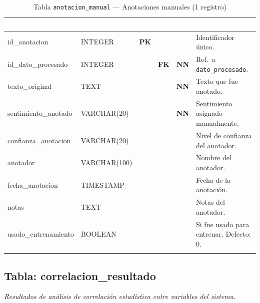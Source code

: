 \documentclass[11pt,a4paper]{article}
\newcommand{\tableheadrow}{\rowcolor{tableheader}}
\newcommand{\tablehead}[1]{\textcolor{white}{\textbf{#1}}}
\newcommand{\pk}{\textcolor{emiblue}{\textbf{PK}}}
\newcommand{\fk}{\textcolor{orange!80!black}{\textbf{FK}}}
\newcommand{\nn}{\textcolor{red!70!black}{\textbf{NN}}}
\begin{document}
\begin{longtable}{p{4.2cm} p{2.8cm} c c c p{4.5cm}}
\toprule
\tableheadrow
\tablehead{Campo} & \tablehead{Tipo} & \tablehead{PK} & \tablehead{FK} & \tablehead{NN} & \tablehead{Descripción} \\
\midrule
\endhead
id\_anotacion & INTEGER & \pk & & & Identificador único. \\
\rowcolor{tablerow}
id\_dato\_procesado & INTEGER & & \fk & \nn & Ref.\ a \texttt{dato\_procesado}. \\
texto\_original & TEXT & & & \nn & Texto que fue anotado. \\
\rowcolor{tablerow}
sentimiento\_anotado & VARCHAR(20) & & & \nn & Sentimiento asignado manualmente. \\
confianza\_anotacion & VARCHAR(20) & & & & Nivel de confianza del anotador. \\
\rowcolor{tablerow}
anotador & VARCHAR(100) & & & & Nombre del anotador. \\
fecha\_anotacion & TIMESTAMP & & & & Fecha de la anotación. \\
\rowcolor{tablerow}
notas & TEXT & & & & Notas del anotador. \\
usado\_entrenamiento & BOOLEAN & & & & Si fue usado para entrenar. Defecto: 0. \\
\bottomrule
\caption{Tabla \texttt{anotacion\_manual} — Anotaciones manuales (1 registro)}
\end{longtable}

\subsection{Tabla: correlacion\_resultado}
\textit{Resultados de análisis de correlación estadística entre variables del sistema.}
\end{document}
